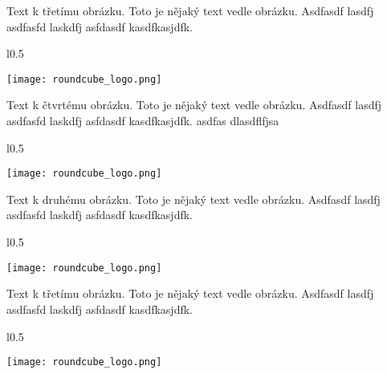 \documentclass[12pt,a4paper,twoside]{book}
\begin{document}
Text k třetímu obrázku. Toto je nějaký text vedle obrázku. Asdfasdf lasdfj asdfasfd laskdfj asfdasdf kasdfkasjdfk.
\newline

\begin{wrapfigure}{l}{0.5\textwidth}
  \vspace{-20pt}
  \begin{center}
    \texttt{[image: roundcube\_logo.png]}
  \end{center}
  \vspace{-20pt}
\end{wrapfigure}

Text k čtvrtému obrázku. Toto je nějaký text vedle obrázku. Asdfasdf lasdfj asdfasfd laskdfj asfdasdf kasdfkasjdfk.
\newline
asdfas dlasdflfjsa 

\begin{wrapfigure}{l}{0.5\textwidth}
  \vspace{-20pt}
  \begin{center}
    \texttt{[image: roundcube\_logo.png]}
  \end{center}
  \vspace{-20pt}
\end{wrapfigure}

Text k druhému obrázku. Toto je nějaký text vedle obrázku. Asdfasdf lasdfj asdfasfd laskdfj asfdasdf kasdfkasjdfk.
\newline

\begin{wrapfigure}{l}{0.5\textwidth}
  \vspace{-20pt}
  \begin{center}
    \texttt{[image: roundcube\_logo.png]}
  \end{center}
  \vspace{-20pt}
\end{wrapfigure}

Text k třetímu obrázku. Toto je nějaký text vedle obrázku. Asdfasdf lasdfj asdfasfd laskdfj asfdasdf kasdfkasjdfk.
\newline

\begin{wrapfigure}{l}{0.5\textwidth}
  \vspace{-20pt}
  \begin{center}
    \texttt{[image: roundcube\_logo.png]}
  \end{center}
  \vspace{-20pt}
\end{wrapfigure}
\end{document}
